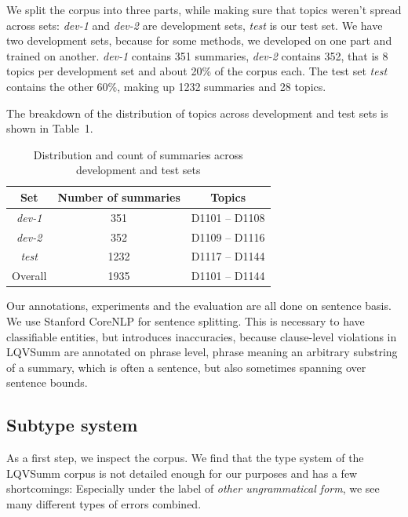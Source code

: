 \documentclass[a4paper,10pt]{scrartcl}
\theoremstyle{style}
\begin{document}
We split the corpus into three parts, while making sure that topics weren't spread across sets: \textit{dev-1} and \textit{dev-2} are development sets, \textit{test} is our test set. We have two development sets, because for some methods, we developed on one part and trained on another.
\textit{dev-1} contains 351 summaries, \textit{dev-2} contains 352, that is 8 topics per development set and about 20\% of the corpus each.
The test set \textit{test} contains the other 60\%, making up 1232 summaries and 28 topics.

The breakdown of the distribution of topics across development and test sets is shown in Table~1.%

\begin{table}[H]
\begin{center}
\begin{tabular}{|c|c|c|}
\hline
\textbf{Set} & \textbf{Number of summaries} & \textbf{Topics}\\
\hline
\textit{dev-1} & 351 & D1101 -- D1108\\
\hline
\textit{dev-2} & 352 & D1109 -- D1116\\
\hline
\textit{test} & 1232 & D1117 -- D1144\\
\hline\hline
Overall & 1935 & D1101 -- D1144\\
\hline
\end{tabular}
\end{center}
\label{testsets}
\caption{Distribution and count of summaries across development and test sets}
\end{table}

Our annotations, experiments and the evaluation are all done on sentence basis. We use Stanford CoreNLP \citep{manning-EtAl:2014:P14-5} for sentence splitting. This is necessary to have classifiable entities, but introduces inaccuracies, because clause-level violations in LQVSumm are annotated on phrase level, phrase meaning an arbitrary substring of a summary, which is often a sentence, but also sometimes spanning over sentence bounds.

\subsection{Subtype system}
\label{s_subtypes}

As a first step, we inspect the corpus. We find that the type system of the LQVSumm corpus \citep{friedrichlqvsumm} is not detailed enough for our purposes and has a few shortcomings: Especially under the label of \textit{other ungrammatical form}, we see many different types of errors combined.
\end{document}
